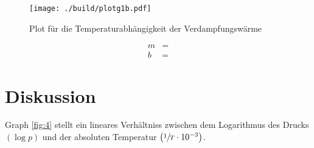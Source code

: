 \begin{figure}[H]
    \centering
    \texttt{[image: ./build/plotg1b.pdf]}
    \caption{Plot für die Temperaturabhängigkeit der Verdampfungswärme}
    \label{fig:5}
\end{figure}

\begin{align}
    m &= \text{}\\
    b &= \text{}
\end{align}


\section{Diskussion}

\justifying Graph \ref{fig:4} stellt ein lineares Verhältniss zwischen dem Logarithmus des Drucks $\left( \log{p} \right)$ und 
der absoluten Temperatur $\left( \sfrac{1}{T} \cdot 10^{-3} \right)$.


\newpage
\printbibliography


